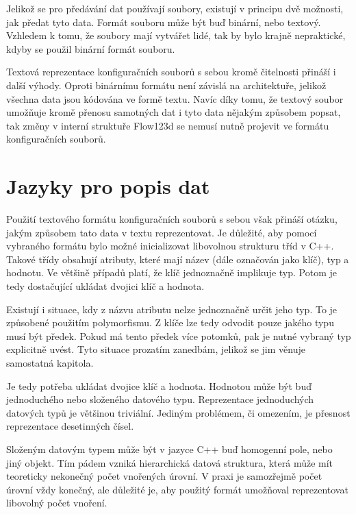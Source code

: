 \documentclass[FM,DP]{tulthesis}
\begin{document}
Jelikož se pro předávání dat používají soubory, existují v principu dvě možnosti, jak předat tyto data. Formát souboru může být buď binární, nebo textový. Vzhledem k tomu, že soubory mají vytvářet lidé, tak by bylo krajně nepraktické, kdyby se použil binární formát souboru.

Textová reprezentace konfiguračních souborů s sebou kromě čitelnosti přináší i další výhody. Oproti binárnímu formátu není závislá na architektuře, jelikož všechna data jsou kódována ve formě textu. Navíc díky tomu, že textový soubor umožňuje kromě přenosu samotných dat i tyto data nějakým způsobem popsat, tak změny v interní struktuře Flow123d se nemusí nutně projevit ve formátu konfiguračních souborů.


\section{Jazyky pro popis dat}

Použití textového formátu konfiguračních souborů s sebou však přináší otázku, jakým způsobem tato data v textu reprezentovat. Je důležité, aby pomocí vybraného formátu bylo možné inicializovat libovolnou strukturu tříd v C++. Takové třídy obsahují atributy, které mají název (dále označován jako klíč), typ a hodnotu. Ve většině případů platí, že klíč jednoznačně implikuje typ. Potom je tedy dostačující ukládat dvojici klíč a hodnota.

Existují i situace, kdy z názvu atributu nelze jednoznačně určit jeho typ. To je způsobené použitím polymorfismu. Z klíče lze tedy odvodit pouze jakého typu musí být předek. Pokud má tento předek více potomků, pak je nutné vybraný typ explicitně uvést. Tyto situace prozatím zanedbám, jelikož se jim věnuje samostatná kapitola.

Je tedy potřeba ukládat dvojice klíč a hodnota. Hodnotou může být buď jednoduchého nebo složeného datového typu. Reprezentace jednoduchých datových typů je většinou triviální. Jediným problémem, či omezením, je přesnost reprezentace desetinných čísel.

Složeným datovým typem může být v jazyce C++ buď homogenní pole, nebo jiný objekt. Tím pádem vzniká hierarchická datová struktura, která může mít teoreticky nekonečný počet vnořených úrovní. V praxi je samozřejmě počet úrovní vždy konečný, ale důležité je, aby použitý formát umožňoval reprezentovat libovolný počet vnoření.
\end{document}
